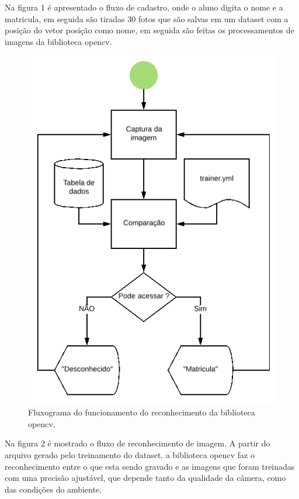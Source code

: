 \documentclass[conference,compsoc]{IEEEtran}
\begin{document}
Na figura 1 é apresentado o fluxo de cadastro, onde o aluno digita o nome e a matricula, em seguida são tiradas 30 fotos que são salvas em um dataset com a posição do vetor posição como nome, em seguida são feitas os processamentos de imagens da biblioteca opencv.

\begin{figure}[!ht]
		\centering
		\includegraphics[scale=0.25]{Reconehcimento.png}
		\caption{Fluxograma do funcionamento do reconhecimento da biblioteca opencv.}
\end{figure}

Na figura 2 é mostrado o fluxo de reconhecimento de imagem. A partir do arquivo gerado pelo treinamento do dataset, a biblioteca opencv faz o reconhecimento entre o que esta sendo gravado e as imagens que foram treinadas com uma precisão ajustável, que depende tanto da qualidade da câmera, como das condições do ambiente. 
\end{document}
